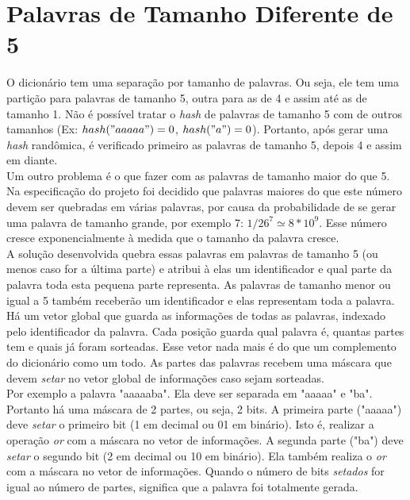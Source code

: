 \documentclass[a4paper]{article}
\begin{document}
\section{Palavras de Tamanho Diferente de 5}
\indent \indent O dicionário tem uma separação por tamanho de palavras. Ou seja, ele tem uma partição para palavras de tamanho 5, outra para as de 4 e assim até as de tamanho 1. Não é possível tratar o \emph{hash} de palavras de tamanho 5 com de outros tamanhos (Ex: \begin{math}hash("aaaaa") = 0\end{math}, \begin{math}hash("a") = 0\end{math}). Portanto, após gerar uma \emph{hash} randômica, é verificado primeiro as palavras de tamanho 5, depois 4 e assim em diante.\\
\indent Um outro problema é o que fazer com as palavras de tamanho maior do que 5. Na especificação do projeto foi decidido que palavras maiores do que este número devem ser quebradas em várias palavras, por causa da probabilidade de se gerar uma palavra de tamanho grande, por exemplo 7: \begin{math}1/26^7 \simeq 8*10^9\end{math}. Esse número cresce exponencialmente à medida que o tamanho da palavra cresce.\\
\indent A solução desenvolvida quebra essas palavras em palavras de tamanho 5 (ou menos caso for a última parte) e atribui à elas um identificador e qual parte da palavra toda esta pequena parte representa. As palavras de tamanho menor ou igual a 5 também receberão um identificador e elas representam toda a palavra. Há um vetor global que guarda as informações de todas as palavras, indexado pelo identificador da palavra. Cada posição guarda qual palavra é, quantas partes tem e quais já foram sorteadas. Esse vetor nada mais é do que um complemento do dicionário como um todo. As partes das palavras recebem uma máscara que devem \emph{setar} no vetor global de informações caso sejam sorteadas.\\
\indent Por exemplo a palavra "aaaaaba". Ela deve ser separada em "aaaaa" e "ba". Portanto há uma máscara de 2 partes, ou seja, 2 bits. A primeira parte ("aaaaa") deve \emph{setar} o primeiro bit (1 em decimal ou 01 em binário). Isto é, realizar a operação \emph{or} com a máscara no vetor de informações. A segunda parte ("ba") deve \emph{setar} o segundo bit (2 em decimal ou 10 em binário). Ela também realiza o \emph{or} com a máscara no vetor de informações. Quando o número de bits \emph{setados} for igual ao número de partes, significa que a palavra foi totalmente gerada.
\end{document}
